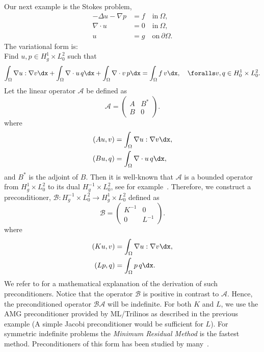 Our next example is the Stokes problem,
\begin{align}
  -\Delta u - \nabla p &= f \quad \mbox{in} \ \Omega, \\
  \nabla \cdot u &= 0 \quad \mbox{in} \  \Omega, \\
  u &= g   \quad \mbox{on} \  \partial \Omega.
\end{align}
The variational form is: \\
Find $u,p \in H^1_g \times L_0^2$ such that
\[
\int_\Omega \nabla u : \nabla v \dx +
\int_\Omega \nabla \cdot u \, q \dx +
\int_\Omega \nabla \cdot v \, p \dx = \int_\Omega f\, v \dx   , \quad
\foralls v,q \in H^1_0 \times L_0^2.
\]
Let the linear operator $\mathcal{A}$ be defined as
\[
\mathcal{A}  =
\begin{pmatrix} A & B^* \\ B & 0 \end{pmatrix}.
\]
where
\begin{align}
  (A u, v) &= \int_\Omega \nabla u : \nabla v \dx, \\
  (B u, q) &= \int_\Omega \nabla \cdot u \, q \dx,
\end{align}
and $B^*$ is the adjoint of $B$.  Then it is well-known that
$\mathcal{A}$ is a bounded operator from $H^1_g \times L_0^2$ to its
dual $H_g^{-1} \times L_0^2$, see for
example~\citet{Brezzi1974,BrezziFortin1991}. Therefore, we construct a
preconditioner, $\mathcal{B}: H_g^{-1} \times L_0^2 \rightarrow
H^1_g \times L_0^2$ defined as
\[
\mathcal{B}
=
\begin{pmatrix} K^{-1} & 0 \\ 0 & L^{-1} \end{pmatrix}.
\]
where
\begin{align}
  (K u, v) &= \int_\Omega \nabla u: \nabla v \dx, \\
  (L p, q) &= \int_\Omega p \, q \dx.
\end{align}
We refer to \citet{MardalWinther11} for a mathematical explanation of
the derivation of such preconditioners.  Notice that the operator
$\mathcal{B}$ is positive in contrast to $\mathcal{A}$. Hence, the
preconditioned operator $\mathcal{B} \mathcal{A}$ will be
indefinite. For both $K$ and $L$, we use the AMG preconditioner
provided by ML/Trilinos as described in the previous example (A simple
Jacobi preconditioner would be sufficient for $L$).  For symmetric
indefinite problems the \emph{Minimum Residual Method} is the fastest
method. Preconditioners of this form has been studied by
many~\citep{ElmanSilvesterWathen2005,RustenWinther1992,SilvesterWathen1993,SilvesterWathen1994}.

